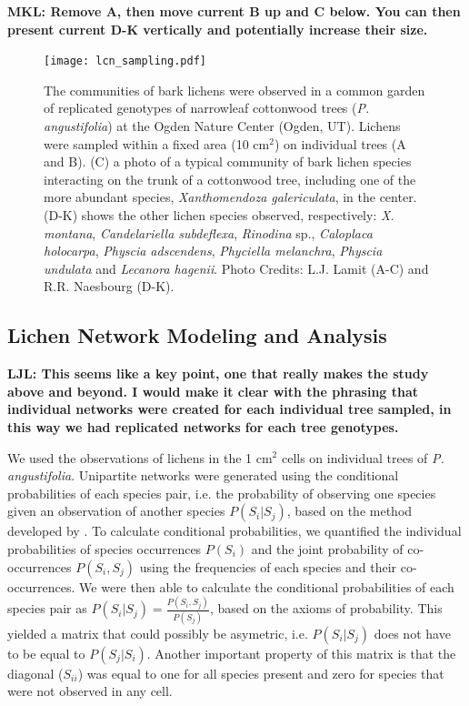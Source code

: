 \documentclass[9pt,twocolumn,twoside,lineno]{pnas-new}
\begin{document}
{\textbf{MKL: Remove A, then move current B up and C below. You can
  then present current D-K vertically and potentially increase their
  size.}


\begin{figure}[ht]
\centering
\texttt{[image: lcn\_sampling.pdf]}
\caption{The communities of bark lichens were observed in a common
  garden of replicated genotypes of narrowleaf cottonwood trees
  (\textit{P. angustifolia}) at the Ogden Nature Center (Ogden,
  UT). Lichens were sampled within a fixed area (10 cm$^2$) on
  individual trees (A and B). (C) a photo of a typical community of
  bark lichen species interacting on the trunk of a cottonwood tree,
  including one of the more abundant species, \textit{Xanthomendoza
    galericulata}, in the center. (D-K) shows the other lichen species
  observed, respectively:  \textit{X. montana}, \textit{Candelariella
    subdeflexa}, \textit{Rinodina} sp., \textit{Caloplaca holocarpa},
  \textit{Physcia adscendens}, \textit{Phyciella melanchra},
  \textit{Physcia undulata} and \textit{Lecanora hagenii}. Photo
  Credits: L.J. Lamit (A-C) and R.R. Naesbourg (D-K).}
\label{fig:lichen_sampling}
\end{figure}


\subsection*{Lichen Network Modeling and Analysis}

\textbf{LJL: This seems like a key point, one that really makes the
  study above and beyond.  I would make it clear with the phrasing
  that individual networks were created for each individual tree
  sampled, in this way we had replicated networks for each tree
  genotypes.}

We used the observations of lichens in the 1 cm$^2$ cells on individual
trees of \textit{P. angustifolia}. Unipartite networks were generated
using the conditional probabilities of each species pair, i.e. the
probability of observing one species given an observation of another
species $P(S_i | S_j)$, based on the method developed by
\citep{Araujo2011}. To calculate conditional probabilities, we
quantified the individual probabilities of species occurrences
$P(S_i)$ and the joint probability of co-occurrences $P(S_i,S_j)$
using the frequencies of each species and their co-occurrences. We
were then able to calculate the conditional probabilities of each
species pair as $P(S_i|S_j) = \frac{P(S_i,S_j)}{P(S_j)}$, based on the
axioms of probability. This yielded a matrix that could possibly be
asymetric, i.e. $P(S_i|S_j)$ does not have to be equal to
$P(S_j|S_i)$. Another important property of this matrix is that the
diagonal ($S_{ii}$) was equal to one for all species present and zero
for species that were not observed in any cell.

}
\end{document}

